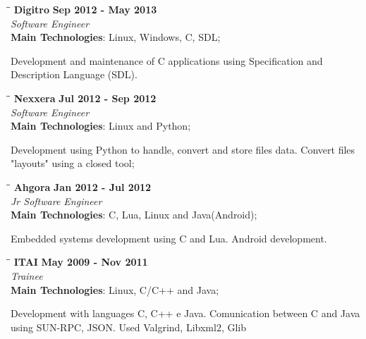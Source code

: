 \documentclass[margin]{res}
\begin{document}
\begin{resume}
\vspace{-0.1in}
   \begin{tabbing}
   \hspace{2.3in}\= \hspace{1.7in}\= \kill %
    \textbf{Digitro}    \>\>\textbf{Sep 2012 - May 2013}\\
    \textit{Software Engineer}\\        
    \textbf{Main Technologies}: Linux, Windows, C, SDL;
   \end{tabbing}\vspace{-20pt}      %
    \vspace{2mm}
    Development and maintenance of C applications using Specification and Description Language (SDL).
    
   \begin{tabbing}
   \hspace{2.3in}\= \hspace{1.7in}\= \kill %
    \textbf{Nexxera}    \>\>\textbf{Jul 2012 - Sep 2012}\\
    \textit{Software Engineer}\\   
    \textbf{Main Technologies}: Linux and Python;
   \end{tabbing}\vspace{-20pt}      %
    \vspace{2mm}
    Development using Python to handle, convert and store files data. Convert files "layouts" using a closed tool;
   
   \begin{tabbing}
   \hspace{2.3in}\= \hspace{1.5in}\= \kill %
    \textbf{Ahgora}    \>\>\textbf{Jan 2012 - Jul 2012}\\
    \textit{Jr Software Engineer}\\   
    \textbf{Main Technologies}: C, Lua, Linux and Java(Android);
   \end{tabbing}\vspace{-20pt}      %
    \vspace{2mm}
       Embedded systems development using C and Lua. Android development.
       
   \begin{tabbing}
   \hspace{2.3in}\= \hspace{1.5in}\= \kill %
    \textbf{ITAI}    \>\>\textbf{May 2009 - Nov 2011}\\
    \textit{Trainee}\\   
    \textbf{Main Technologies}: Linux, C/C++ and Java;
   \end{tabbing}\vspace{-20pt}      %
    \vspace{2mm}
       Development with languages C, C++ e Java. Comunication between C and Java using SUN-RPC, JSON. Used Valgrind, Libxml2, Glib


\end{resume}
\end{document}
